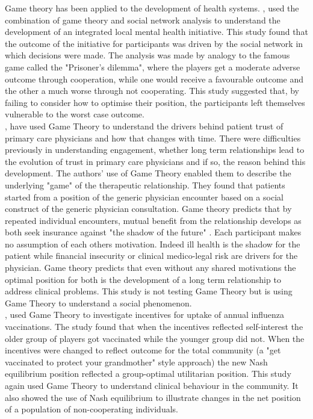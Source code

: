 \documentclass[11pt,a4paper]{article}
\begin{document}
Game theory has been applied to the development of health systems. \citep{dobson2004sustainable}, used the combination of game theory and social network analysis to understand the development of an integrated local mental health initiative. This study found that the outcome of the initiative for participants was driven by the social network in which decisions were made. The analysis was made by analogy to the famous game called the "Prisoner's dilemma", where the players get a moderate adverse outcome through cooperation, while one would receive a favourable outcome and the other a much worse through not cooperating. This study suggested that, by failing to consider how to optimise their position, the participants left themselves vulnerable to the worst case outcome. \\

\citet{tarrant2010continuity}, have used Game Theory to understand the drivers behind patient trust of primary care physicians and how that changes with time. There were difficulties previously in understanding engagement, whether long term relationships lead to the evolution of trust in primary care physicians and if so, the reason behind this development. The authors' use of Game Theory enabled them to describe the underlying "game" of the therapeutic relationship. They found that patients started from a position of the generic physician encounter based on a social construct of the generic physician consultation. Game theory predicts that by repeated individual encounters, mutual benefit from the relationship develops as both seek insurance against "the shadow of the future" \citep{tarrant2010continuity}. Each participant makes no assumption of each others motivation. Indeed ill health is the shadow for the patient while financial insecurity or clinical medico-legal risk  are drivers for the physician. Game theory predicts that even without any shared motivations the optimal position for both is the development of a long term relationship to address clinical problems.  This study is not testing Game Theory but is using Game Theory to understand a social phenomenon. \\

\citet{chapman2012using}, used Game Theory to investigate incentives for uptake of annual influenza vaccinations.  The study found that when the incentives reflected self-interest the older group of players got vaccinated while the younger group did not. When the incentives were changed to reflect outcome for the total community (a "get vaccinated to protect your grandmother" style approach) the new Nash equilibrium position reflected a group-optimal utilitarian position. This study again used Game Theory to understand clinical behaviour in the community. It also showed the use of Nash equilibrium to illustrate changes in the net position of a population of non-cooperating individuals. \\
\end{document}
